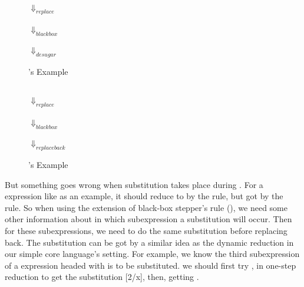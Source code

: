 \begin{center}
\begin{figure}[thb]
\centering
{}\\ $\Downarrow_{replace}$\\ \\ $\Downarrow_{blackbox}$\\ \\ $\Downarrow_{desugar}$\\ 
\caption{'s Example}
\label{fig:e1}
\end{figure}

\begin{figure}[thb]
\centering
{}\\ $\Downarrow_{replace}$ \\\\ $\Downarrow_{blackbox}$\\  \\ $\Downarrow_{replaceback}$\\ 
\caption{'s Example}
\label{fig:e2}
\end{figure}
\end{center}

But something goes wrong when substitution takes place during . For a expression like  as an example, it should reduce to  by the  rule, but got  by the  rule. So when using the extension of black-box stepper's rule (), we need some other information about in which subexpression a substitution will occur. Then for these subexpressions, we need to do the same substitution before replacing back. The substitution can be got by a similar idea as the dynamic reduction in our simple core language's setting. For example, we know the third subexpression of a expression headed with  is to be substituted. we should first try ,  in one-step reduction to get the substitution [2/x], then, getting . 

